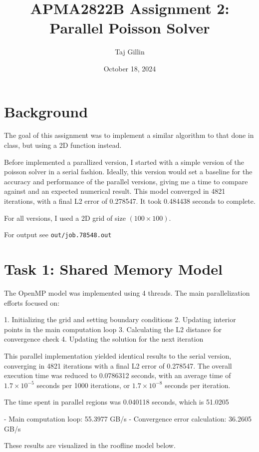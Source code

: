 \documentclass{article}
\title{APMA2822B Assignment 2: Parallel Poisson Solver}
\author{Taj Gillin}
\date{October 18, 2024}
\begin{document}
\maketitle
 
\section{Background}

The goal of this assignment was to implement a similar algorithm to that done in class, but using a 2D function instead. 

Before implemented a parallized version, I started with a simple version of the poisson solver in a serial fashion. Ideally, this version would set a baseline for the accuracy and performance of the parallel versions, giving me a time to compare against and an expected numerical result. This model converged in 4821 iterations, with a final L2 error of 0.278547. It took 0.484438 seconds to complete.

For all versions, I used a 2D grid of size $(100 \times 100)$.

For output see \texttt{out/job.78548.out}


\section{Task 1: Shared Memory Model}

The OpenMP model was implemented using 4 threads. The main parallelization efforts focused on:

1. Initializing the grid and setting boundary conditions
2. Updating interior points in the main computation loop
3. Calculating the L2 distance for convergence check
4. Updating the solution for the next iteration

This parallel implementation yielded identical results to the serial version, converging in 4821 iterations with a final L2 error of 0.278547. The overall execution time was reduced to 0.0786312 seconds, with an average time of $1.7 \times 10^{-5}$ seconds per 1000 iterations, or $1.7 \times 10^{-8}$ seconds per iteration.

The time spent in parallel regions was 0.040118 seconds, which is 51.0205%

- Main computation loop: 55.3977 GB/s
- Convergence error calculation: 36.2605 GB/s

These results are visualized in the roofline model below.
\end{document}
